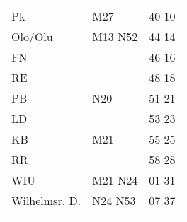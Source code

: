 \begin{tabular}{!{\color{schiefergrau}\vrule width 3pt}*{3}{l!{\color{schiefergrau}\vrule width 3pt}}}
Pk           & \mbus{} M27                                                & 40 10 \\
Olo/Olu      & \nuneun{} \mtram{} M13 \nbus{} N52                         & 44 14 \\
FN           &                                                            & 46 16 \\
RE           &                                                            & 48 18 \\
PB           & \nbus{} N20                                                & 51 21 \\
LD           &                                                            & 53 23 \\
KB           & \mbus{} M21                                                & 55 25 \\
RR           &                                                            & 58 28 \\
WIU          & \mbus{} M21 \nbus{} N24                                    & 01 31 \\
Wilhelmsr. D.& \nbus{} N24 N53                                            & 07 37 \\
\myhline
\end{tabular}
